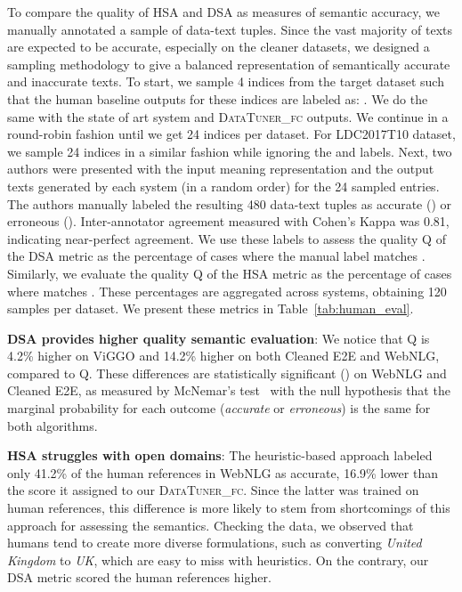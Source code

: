 \documentclass[11pt]{article}
\newcommand{\webnlg}{WebNLG\xspace}
\newcommand{\ldc}{LDC2017T10\xspace}
\newcommand{\viggo}{ViGGO\xspace}
\newcommand{\cleanedee}{Cleaned E2E\xspace}
\newcommand{\qdsa}{Q\xspace}
\newcommand{\qhsa}{Q\xspace}
\newcommand{\systemFcPost}{\textsc{DataTuner\_fc}\xspace}
\theoremstyle{definition}
\theoremstyle{break}
\begin{document}
To compare the quality of HSA and DSA as measures of semantic accuracy, we manually annotated a sample of data-text tuples. 
Since the vast majority of texts are expected to be accurate, especially on the cleaner datasets, we designed a sampling methodology to give a balanced representation of semantically accurate and inaccurate texts. 
To start, we sample 4 indices from the target dataset such that the human baseline outputs for these indices are labeled as: .
We do the same with the state of art system and \systemFcPost outputs. We continue in a round-robin fashion until we get 24 indices per dataset. For \ldc dataset, we sample 24 indices in a similar fashion while ignoring the  and  labels.
Next, two authors were presented with the input meaning representation and the output texts generated by each system (in a random order) for the 24 sampled entries. 
The authors manually labeled the resulting 480 data-text tuples as accurate () or erroneous (). Inter-annotator agreement measured with Cohen's Kappa was 0.81, indicating near-perfect agreement.
We use these labels to assess the quality \qdsa of the DSA metric as the percentage of cases where the manual label  matches . Similarly, we evaluate the quality \qhsa of the HSA metric as the percentage of cases where  matches . These percentages are aggregated across systems, obtaining 120 samples per dataset. We present these metrics in Table~\ref{tab:human_eval}. 


\textbf{DSA provides higher quality semantic evaluation}: We notice that \qdsa is 4.2\% higher on \viggo and 14.2\% higher on both \cleanedee and \webnlg, compared to \qhsa. These differences are statistically significant () on \webnlg and \cleanedee, as measured by McNemar's test~\cite{mcnemar1947note} with the null hypothesis that the marginal probability for each outcome (\textit{accurate} or \textit{erroneous}) is the same for both algorithms. 

\textbf{HSA struggles with open domains}: The heuristic-based approach labeled only 41.2\% of the human references in \webnlg as accurate, 16.9\% lower than the score it assigned to our \systemFcPost. Since the latter was trained on human references, this difference is more likely to stem from shortcomings of this approach for assessing the semantics. Checking the data, we observed that humans tend to create more diverse formulations, such as converting \textit{United Kingdom} to \textit{UK}, which are easy to miss with heuristics. On the contrary, our DSA metric scored the human references higher.
\end{document}
